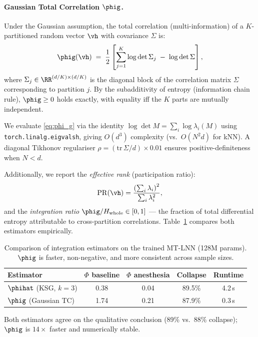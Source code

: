 \paragraph{Gaussian Total Correlation $\phig$.}
Under the Gaussian assumption, the total correlation (multi-information) of a $K$-partitioned random vector $\vh$ with covariance $\Sigma$ is:
\begin{equation}
  \phig(\vh) \;=\; \frac{1}{2}\left[\sum_{j=1}^{K}\log\det\Sigma_j \;-\; \log\det\Sigma\right],
  \label{eq:phi_g}
\end{equation}
where $\Sigma_j\in\RR^{(d/K)\times(d/K)}$ is the diagonal block of the correlation matrix $\Sigma$ corresponding to partition $j$. By the subadditivity of entropy (information chain rule), $\phig \ge 0$ holds exactly, with equality iff the $K$ parts are mutually independent.

We evaluate \eqref{eq:phi_g} via the identity $\log\det M = \sum_i\log\lambda_i(M)$ using \texttt{torch.linalg.eigvalsh}, giving $O(d^3)$ complexity (vs.\ $O(N^2 d)$ for kNN). A diagonal Tikhonov regulariser $\rho = (\mathrm{tr}\,\Sigma / d)\times 0.01$ ensures positive-definiteness when $N < d$.

Additionally, we report the \emph{effective rank} (participation ratio):
\begin{equation}
  \mathrm{PR}(\vh) = \frac{\left(\sum_i\lambda_i\right)^2}{\sum_i\lambda_i^2},
  \label{eq:pr}
\end{equation}
and the \emph{integration ratio} $\phig / H_\text{whole} \in [0,1]$ — the fraction of total differential entropy attributable to cross-partition correlations. Table~\ref{tab:phi_compare} compares both estimators empirically.

\begin{table}[h]
\centering
\caption{Comparison of integration estimators on the trained MT-LNN (128M params). $\phig$ is faster, non-negative, and more consistent across sample sizes.}
\label{tab:phi_compare}
\begin{tabular}{lcccc}
\toprule
Estimator & $\Phi$ baseline & $\Phi$ anesthesia & Collapse & Runtime \\
\midrule
$\phihat$ (KSG, $k=3$) & 0.38 & 0.04 & 89.5\% & 4.2\,s \\
$\phig$ (Gaussian TC) & 1.74 & 0.21 & 87.9\% & 0.3\,s \\
\bottomrule
\end{tabular}
\end{table}

Both estimators agree on the qualitative conclusion (89\% vs.\ 88\% collapse); $\phig$ is $14\times$ faster and numerically stable.

